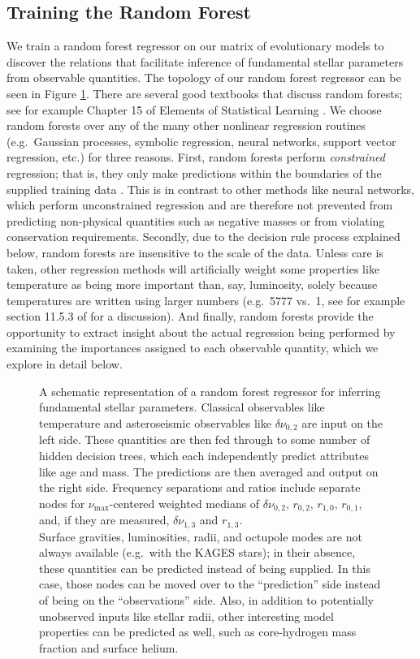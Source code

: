 \documentclass[manuscript]{aastex}
\begin{document}
\subsection{Training the Random Forest} \label{sec:forest}
We train a random forest regressor on our matrix of evolutionary models to discover the relations that facilitate inference of fundamental stellar parameters from observable quantities. The topology of our random forest regressor can be seen in Figure \ref{fig:rf}. There are several good textbooks that discuss random forests; see for example Chapter 15 of Elements of Statistical Learning \citep{hastie2005elements}. We choose random forests over any of the many other nonlinear regression routines (e.g.~Gaussian processes, symbolic regression, neural networks, support vector regression, etc.) for three reasons. First, random forests perform \emph{constrained} regression; that is, they only make predictions within the boundaries of the supplied training data \citep[see e.g.~section 9.2.1 of][]{hastie2005elements}. This is in contrast to other methods like neural networks, which perform unconstrained regression and are therefore not prevented from predicting non-physical quantities such as negative masses or from violating conservation requirements. Secondly, due to the decision rule process explained below, random forests are insensitive to the scale of the data. Unless care is taken, other regression methods will artificially weight some properties like temperature as being more important than, say, luminosity, solely because temperatures are written using larger numbers (e.g.~5777 vs.~1, see for example section 11.5.3 of \citealt{hastie2005elements} for a discussion). And finally, random forests provide the opportunity to extract insight about the actual regression being performed by examining the importances assigned to each observable quantity, which we explore in detail below. 

\begin{figure}
    \centering
    
    \caption{A schematic representation of a random forest regressor for inferring fundamental stellar parameters. Classical observables like temperature and asteroseismic observables like $\delta\nu_{0,2}$ are input on the left side. These quantities are then fed through to some number of hidden decision trees, which each independently predict attributes like age and mass. The predictions are then averaged and output on the right side. Frequency separations and ratios include separate nodes for $\nu_{\max}$-centered weighted medians of $\delta\nu_{0,2}$, $r_{0,2}$, $r_{1,0}$, $r_{0,1}$, and, if they are measured, $\delta\nu_{1,3}$ and $r_{1,3}$.\\
    Surface gravities, luminosities, radii, and octupole modes are not always available (e.g.~with the KAGES stars); in their absence, these quantities can be predicted instead of being supplied. In this case, those nodes can be moved over to the ``prediction'' side instead of being on the ``observations'' side. Also, in addition to potentially unobserved inputs like stellar radii, other interesting model properties can be predicted as well, such as core-hydrogen mass fraction and surface helium. }
    \label{fig:rf}
\end{figure}
\end{document}
